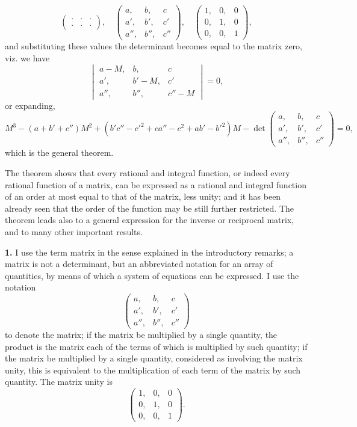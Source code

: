 \documentclass[11pt,a4paper]{book}
\begin{document}
\begin{center}
\[\begin{pmatrix}
\cdot & \cdot & \cdot \\
\cdot & \cdot & \cdot
\end{pmatrix},
\quad
\begin{pmatrix} a, & b, & c \\ a', & b', & c' \\ a'', & b'', & c'' \end{pmatrix},
\quad
\begin{pmatrix} 1, & 0, & 0 \\ 0, & 1, & 0 \\ 0, & 0, & 1 \end{pmatrix},
\]
and substituting these values the determinant becomes equal to the matrix zero, viz. we have
\[
\begin{vmatrix}
a-M, & b, & c \\
a', & b'-M, & c' \\
a'', & b'', & c''-M
\end{vmatrix} = 0,
\]
or expanding,
\[
M^3 - (a+b'+c'')M^2 + (b'c''-c'^2+ca''-c^2+ab'-b'^2)M - \det\begin{pmatrix} a,&b,&c\\a',&b',&c'\\a'',&b'',&c''\end{pmatrix} = 0,
\]
which is the general theorem.

The theorem shows that every rational and integral function, or indeed every rational function of a matrix, can be expressed as a rational and integral function of an order at most equal to that of the matrix, less unity; and it has been already seen that the order of the function may be still further restricted. The theorem leads also to a general expression for the inverse or reciprocal matrix, and to many other important results.

\medskip
\noindent\textbf{1.} I use the term matrix in the sense explained in the introductory remarks; a matrix is not a determinant, but an abbreviated notation for an array of quantities, by means of which a system of equations can be expressed. I use the notation
\[
\begin{pmatrix} a, & b, & c \\ a', & b', & c' \\ a'', & b'', & c'' \end{pmatrix}
\]
to denote the matrix; if the matrix be multiplied by a single quantity, the product is the matrix each of the terms of which is multiplied by such quantity; if the matrix be multiplied by a single quantity, considered as involving the matrix unity, this is equivalent to the multiplication of each term of the matrix by such quantity. The matrix unity is
\[
\begin{pmatrix} 1, & 0, & 0 \\ 0, & 1, & 0 \\ 0, & 0, & 1 \end{pmatrix}.
\]


\end{center}
\end{document}
